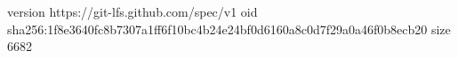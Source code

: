 version https://git-lfs.github.com/spec/v1
oid sha256:1f8e3640fc8b7307a1ff6f10bc4b24e24bf0d6160a8c0d7f29a0a46f0b8ecb20
size 6682
